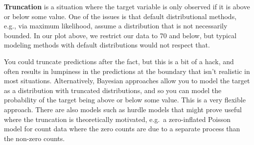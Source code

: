 \documentclass[
  letterpaper,
]{krantz}
\begin{document}
\textbf{Truncation} is a situation where the target variable is only
observed if it is above or below some value. One of the issues is that
default distributional methods, e.g., via maximum likelihood, assume a
distribution that is not necessarily bounded. In our plot above, we
restrict our data to 70 and below, but typical modeling methods with
default distributions would not respect that.

You could truncate predictions after the fact, but this is a bit of a
hack, and often results in lumpiness in the predictions at the boundary
that isn't realistic in most situations. Alternatively, Bayesian
approaches allow you to model the target as a distribution with
truncated distributions, and so you can model the probability of the
target being above or below some value. This is a very flexible
approach. There are also models such as hurdle models that might prove
useful where the truncation is theoretically motivated, e.g.~a
zero-inflated Poisson model for count data where the zero counts are due
to a separate process than the non-zero counts.
\end{document}

